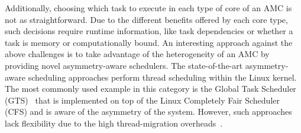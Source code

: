 Additionally, choosing which task to execute in each type of core of an AMC is not as straightforward. 
Due to the different benefits offered by each core type, such decisions require runtime information, like task dependencies or whether a task is memory or computationally bound.
An interesting approach against the above challenges is to take advantage of the heterogeneity of an AMC by providing novel asymmetry-aware schedulers. 
The state-of-the-art asymmetry-aware scheduling approaches perform thread scheduling within the Linux kernel. 
The most commonly used example in this category is the Global Task Scheduler (GTS)~\cite{samsung} that is implemented on top of the Linux Completely Fair Scheduler (CFS) and is aware of the asymmetry of the system.
However, such approaches lack flexibility due to the high thread-migration overheads~\cite{AMC_survey}.



